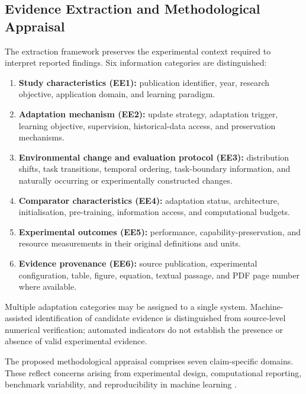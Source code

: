 \subsection{Evidence Extraction and Methodological Appraisal}

The extraction framework preserves the experimental
context required to interpret reported findings.
Six information categories are distinguished:

\begin{enumerate}
	\item \textbf{Study characteristics (EE1):}
	publication identifier, year, research objective,
	application domain, and learning paradigm.
	
	\item \textbf{Adaptation mechanism (EE2):}
	update strategy, adaptation trigger, learning
	objective, supervision, historical-data access,
	and preservation mechanisms.
	
	\item \textbf{Environmental change and evaluation
		protocol (EE3):} distribution shifts, task
	transitions, temporal ordering, task-boundary
	information, and naturally occurring or
	experimentally constructed changes.
	
	\item \textbf{Comparator characteristics (EE4):}
	adaptation status, architecture, initialisation,
	pre-training, information access, and
	computational budgets.
	
	\item \textbf{Experimental outcomes (EE5):}
	performance, capability-preservation, and
	resource measurements in their original
	definitions and units.
	
	\item \textbf{Evidence provenance (EE6):}
	source publication, experimental configuration,
	table, figure, equation, textual passage, and
	PDF page number where available.
\end{enumerate}

Multiple adaptation categories may be assigned to
a single system. Machine-assisted identification
of candidate evidence is distinguished from
source-level numerical verification; automated
indicators do not establish the presence or absence
of valid experimental evidence.

The proposed methodological appraisal comprises
seven claim-specific domains. These reflect concerns
arising from experimental design, computational
reporting, benchmark variability, and reproducibility
in machine learning
\cite{wohlin2012experimentation,bouthillier2021variance,
	pineau2021improving,henderson2020systematic}.

